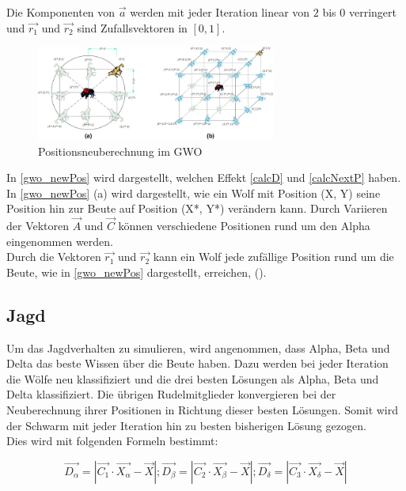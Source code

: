 Die Komponenten von $\vec{a}$ werden mit jeder Iteration linear von $2$ bis $0$ verringert und $\vec{r_1}$ und $\vec{r_2}$ sind Zufallsvektoren in $[0,1]$.\\
\begin{figure}[ht]
    \begin{center}
        \includegraphics[width=0.7\textwidth]{assets/img/Updating_position_of_gray_wolves_in_GWO.jpg}
        \caption[Positionsneuberechnung im GWO]{Positionsneuberechnung im GWO \cite{MIRJALILI201446}}
        \label{gwo_newPos}
    \end{center}
\end{figure}

In \autoref{gwo_newPos} wird dargestellt, welchen Effekt \autoref{calcD} und \autoref{calcNextP} haben. In \autoref{gwo_newPos} (a) wird dargestellt, wie ein Wolf mit Position (X, Y) seine Position hin zur Beute auf Position (X*, Y*) verändern kann. Durch Variieren der Vektoren $\vec{A}$ und $\vec{C}$ können verschiedene Positionen rund um den Alpha eingenommen werden. \\
Durch die Vektoren $\vec{r_1}$ und $\vec{r_2}$ kann ein Wolf jede zufällige Position rund um die Beute, wie in \autoref{gwo_newPos} dargestellt, erreichen, (\cite[vgl. Mirjalili 2014, S.6]{MIRJALILI201446}).

\subsection{Jagd}
Um das Jagdverhalten zu simulieren, wird angenommen, dass Alpha, Beta und Delta das beste Wissen über die Beute haben. Dazu werden bei jeder Iteration die Wölfe neu klassifiziert und die drei besten Lösungen als Alpha, Beta und Delta klassifiziert. Die übrigen Rudelmitglieder konvergieren bei der Neuberechnung ihrer Positionen in Richtung dieser besten Lösungen. Somit wird der Schwarm mit jeder Iteration hin zu besten bisherigen Lösung gezogen. \\
Dies wird mit folgenden Formeln bestimmt:

\begin{equation}
    \vec{D_\alpha} = |\vec{C_1} \cdot \vec{X_\alpha} - \vec{X}|;
    \vec{D_\beta} = |\vec{C_2} \cdot \vec{X_\beta} - \vec{X}|;
    \vec{D_\delta} = |\vec{C_3} \cdot \vec{X_\delta} - \vec{X}|
    \label{calcD_abc}
\end{equation}

